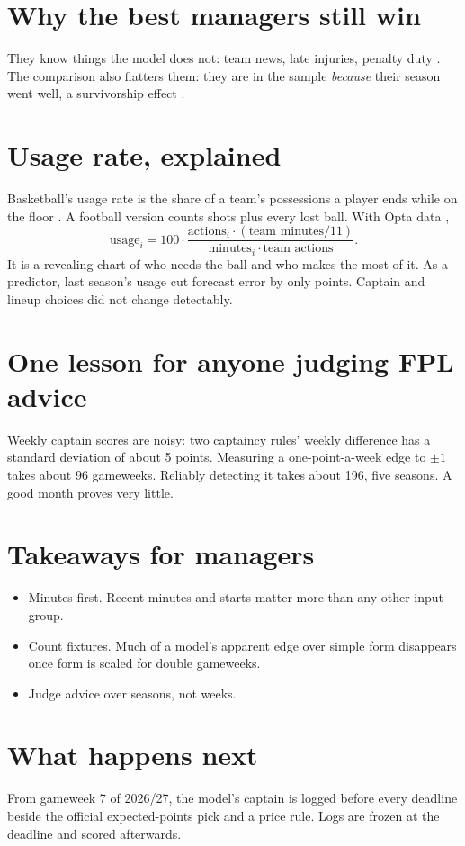 \documentclass[10pt,a4paper,twocolumn]{article}
\begin{document}
\section{Why the best managers still win}
They know things the model does not: team news, late injuries, penalty duty
\citep{bonello2019}. The comparison also flatters them: they are in the sample \emph{because}
their season went well, a survivorship effect \citep{brown1992}.

\section{Usage rate, explained}
Basketball's usage rate is the share of a team's possessions a player ends while on the floor
\citep{bbrefglossary,oliver2004}. A football version \citep{sincerefc2025a,sincerefc2025b} counts
shots plus every lost ball. With Opta data \citep{plstats},
\[
  \text{usage}_i = 100\cdot\frac{\text{actions}_i\cdot(\text{team minutes}/11)}{\text{minutes}_i\cdot\text{team actions}}.
\]
It is a revealing chart of who needs the ball and who makes the most of it. As a predictor,
last season's usage cut forecast error by only \usageMaeGain{} points. Captain and lineup choices
did not change detectably.

\section{One lesson for anyone judging FPL advice}
Weekly captain scores are noisy: two captaincy rules' weekly difference has a standard deviation of
about 5 points. Measuring a one-point-a-week edge to $\pm1$ takes about 96 gameweeks. Reliably
detecting it takes about 196, five seasons. A good month proves very little.

\section{Takeaways for managers}
\begin{itemize}
  \item Minutes first. Recent minutes and starts matter more than any other input group.
  \item Count fixtures. Much of a model's apparent edge over simple form disappears once form is
        scaled for double gameweeks.
  \item Judge advice over seasons, not weeks.
\end{itemize}

\section{What happens next}
From gameweek 7 of 2026/27, the model's captain is logged before every deadline beside the official
expected-points pick and a price rule. Logs are frozen at the deadline and scored afterwards.
\end{document}
